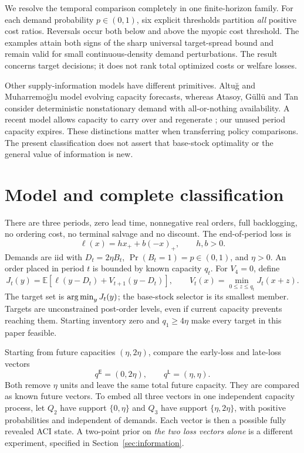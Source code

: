 \documentclass[11pt]{article}
\theoremstyle{remark}\newtheorem{remark}[theorem]{Remark}
\newcommand{\EE}{\mathbb E}
\newcommand{\argmin}{\mathop{\rm arg\,min}}
\newcommand{\Ecase}{\mathsf E}
\newcommand{\Lcase}{\mathsf L}
\begin{document}
We resolve the temporal comparison completely in one finite-horizon
family. For each demand probability $p\in(0,1)$, six explicit thresholds
partition \emph{all} positive cost ratios. Reversals occur both below and
above the myopic cost threshold. The examples attain both signs of the
sharp universal target-spread bound and remain valid for small
continuous-density demand perturbations. The result concerns target
decisions; it does not rank total optimized costs or welfare losses.

Other supply-information models have different primitives. Altu\u{g} and
Muharremo\u{g}lu \cite{Altug} model evolving capacity forecasts, whereas
Atasoy, G\"ull\"u and Tan \cite{Atasoy} consider deterministic
nonstationary demand with all-or-nothing availability. A recent model
allows capacity to carry over and regenerate \cite{Senga}; our unused
period capacity expires. These distinctions matter when transferring
policy comparisons. The present classification does not assert that
base-stock optimality or the general value of information is new.

\section{Model and complete classification}\label{sec:model}
There are three periods, zero lead time, nonnegative real orders,
full backlogging, no ordering cost, no terminal salvage and no discount.
The end-of-period loss is
\[
 \ell(x)=h x_++b(-x)_+,\qquad h,b>0.
\]
Demands are iid with $D_t=2\eta B_t$,
$\Pr(B_t=1)=p\in(0,1)$, and $\eta>0$.
An order placed in period $t$ is bounded by known capacity $q_t$.
For $V_4=0$, define
\begin{equation}\label{eq:bellman}
 J_t(y)=\EE[\ell(y-D_t)+V_{t+1}(y-D_t)],\qquad
 V_t(x)=\min_{0\le z\le q_t}J_t(x+z).
\end{equation}
The target set is $\argmin_yJ_t(y)$; the base-stock selector is its
smallest member. Targets are unconstrained post-order levels, even if
current capacity prevents reaching them. Starting inventory zero and
$q_1\ge4\eta$ make every target in this paper feasible.

Starting from future capacities $(\eta,2\eta)$, compare the early-loss
and late-loss vectors
\[
 q^{\Ecase}=(0,2\eta),\qquad q^{\Lcase}=(\eta,\eta).
\]
Both remove $\eta$ units and leave the same total future capacity.
They are compared as known future vectors. To embed all three vectors in
one independent capacity process, let $Q_2$ have support $\{0,\eta\}$
and $Q_3$ have support $\{\eta,2\eta\}$, with positive probabilities
and independent of demands. Each vector is then a possible fully revealed
ACI state. A two-point prior on \emph{the two loss vectors alone} is a
different experiment, specified in
Section~\ref{sec:information}.
\end{document}
